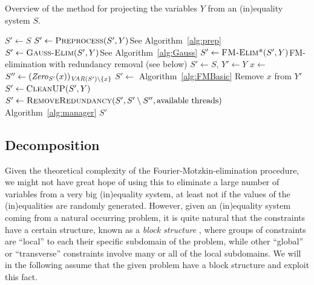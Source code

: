 \begin{algorithm}\caption{Overview of the method for projecting the variables $Y$ from an (in)equality system  $S$.}\label{alg:project}
\begin{algorithmic}[1]
	\State $S'\gets S$
	\State $S'\gets\Call{Preprocess}{S',Y}$\Comment See Algorithm~\ref{alg:prep}
	\State $S'\gets\Call{Gauss-Elim}{S',Y}$\Comment See Algorithm~\ref{alg:Gauss} 
	\State $S'\gets \Call{FM-Elim*}{S',Y}$\Comment FM-elimination with redundancy removal (see below)
\EndFunction
\State
{}
	\State  $S'\gets S$, $Y'\gets Y$
		\State $x\gets$ 
		\State $S''\gets(\mathit{Zero}_{S'}(x))_{\mathit{VAR}(S')\setminus\{x\}}$
		\State $S' \gets$  \Comment Algorithm~\ref{alg:FMBasic}
		\State Remove $x$ from $Y'$
		\State $S'\gets\Call{CleanUP}{S',Y}$
		\State $S'\gets \Call{RemoveRedundancy}{S', S'\setminus S'', \text{available threads}}$ 	\Comment Algorithm~\ref{alg:manager}\label{ln:projx}
	\EndWhile
	\State \Return $S'$
\EndFunction
\end{algorithmic}
\end{algorithm}
%
\subsection{Decomposition}\label{sec:decomp}
Given the theoretical complexity of the Fourier\--Motzkin\--elimination procedure, we might not have great hope of using this to eliminate a large number of variables from a very big (in)equality system, at least not if the values of the (in)equalities are randomly generated.
%
However, given an (in)equality system coming from a natural occurring problem, it is quite natural that the constraints have a certain structure, known as a \emph{block structure} \cite{williams}, where groups of constraints are ``local'' to each their specific subdomain of the problem, %
while other ``global'' or ``transverse'' constraints involve many or all of the local subdomains. We will in the following assume that the given problem have a block structure and exploit this fact. %

